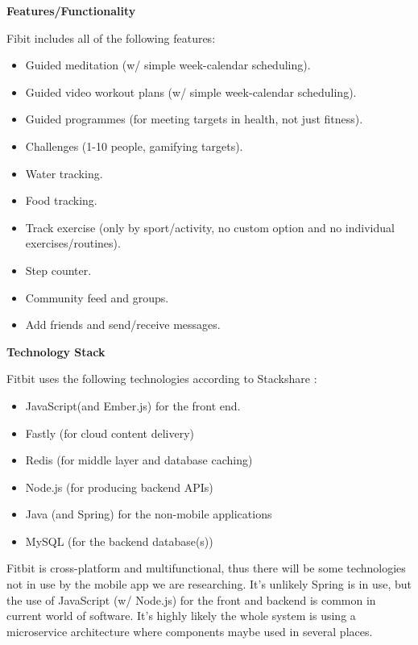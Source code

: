 \textbf{Features/Functionality}
\label{research-breakdown:fitbit-features}
\par
Fibit includes all of the following features:
\begin{multicols}{2}
	\begin{itemize}[noitemsep]
		\item Guided meditation (w/ simple week-calendar scheduling).
		\item Guided video workout plans (w/ simple week-calendar scheduling).
		\item Guided programmes (for meeting targets in health, not just fitness).
		\item Challenges (1-10 people, gamifying targets).
		\item Water tracking.
		\item Food tracking.
		\item Track exercise (only by sport/activity, no custom option and no individual exercises/routines).
		\item Step counter.
		\item Community feed and groups.
		\item Add friends and send/receive messages.
	\end{itemize}
\end{multicols}
\textbf{Technology Stack}
\label{research-breakdown:fitbit-stack}
\par
Fitbit uses the following technologies according to Stackshare \cite{fitbit-stack}:
\begin{itemize}
	\item JavaScript(and Ember.js) for the front end.
	\item Fastly (for cloud content delivery)
	\item Redis (for middle layer and database caching)
	\item Node.js (for producing backend APIs)
	\item Java (and Spring) for the non-mobile applications
	\item MySQL (for the backend database(s))
\end{itemize}
Fitbit is cross-platform and multifunctional, thus there will be some technologies
not in use by the mobile app we are researching. It's unlikely Spring
is in use, but the use of JavaScript (w/ Node.js) for the front and backend is
common in current world of software. It's highly likely
the whole system is using a microservice architecture where components maybe used in several places.
\pagebreak

